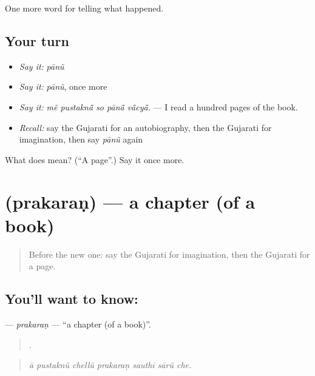 \begin{grammarlens}[title={What you've built}]
One more word for telling what happened.
\end{grammarlens}

\subsection*{Your turn}
\begin{itemize}
\raggedright
  \item \emph{Say it:} \emph{pānũ}
  \item \emph{Say it:} \emph{pānũ}, once more
  \item \emph{Say it:} \emph{mẽ pustaknā̃ so pānā̃ vā̃cyā̃.} — I read a hundred pages of the book.
  \item \emph{Recall:} say the Gujarati for an autobiography, then the Gujarati for imagination, then say \emph{pānũ} again
\end{itemize}

\begin{tcolorbox}[breakable,colback=teal!4,colframe=teal!35!black,title={Before you move on}]
What does  mean? (\textquotedblleft{}A page\textquotedblright{}.) Say it once more.
\end{tcolorbox}
\section[\texorpdfstring{\gu{પ્રકરણ} (prakaraṇ)}{પ્રકરણ (prakaraṇ)}]{ (prakaraṇ) — a chapter (of a book)}

\label{lesson:GU-C337-prakaran}



\begin{quote}
Before the new one: say the Gujarati for imagination, then the Gujarati for a page.
\end{quote}

\subsection*{You'll want to know: }
\textbf{} — \emph{prakaraṇ} — \textquotedblleft{}a chapter (of a book)\textquotedblright{}.

\begin{quote}
      .
\end{quote}

\begin{quote}
\emph{ā pustaknũ chellũ prakaraṇ sauthī sārũ che.}
\end{quote}

